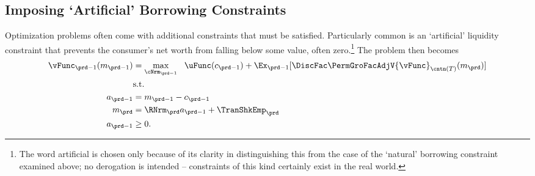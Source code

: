 \documentclass[\econtexRoot/SolvingMicroDSOPs]{subfiles}
\begin{document}
\subsection{Imposing `Artificial' Borrowing Constraints}

Optimization problems often come with additional constraints that must
be satisfied.  Particularly common is an `artificial' liquidity constraint that
prevents the consumer's net worth from falling below some value, often
zero.\footnote{The word artificial is chosen only because of its clarity in distinguishing
  this from the case of the `natural' borrowing constraint examined above; no derogation is
  intended -- constraints of this kind certainly exist in the real world.}  The problem then becomes
\begin{equation*}\begin{gathered}\begin{aligned}
      \vFunc_{\prd-1}(m_{\prd-1})  & = \max_{\cNrm_{\prd-1}} ~~ \uFunc(c_{\prd-1}) + \Ex_{\prd-1} [\DiscFac \PermGroFacAdjV{\vFunc}_{\cntn(T)}(m_{\prd})] \label{eq:ConstrArt}
      \\ & \mbox{s.t.}  \nonumber
      \\ a_{\prd-1}  & = m_{\prd-1} - c_{\prd-1}
      \\ m_{\prd}  & = \RNrm_{\prd} a_{\prd-1} + \TranShkEmp_{\prd}
      \\ a_{\prd-1} & \geq 0 .
    \end{aligned}\end{gathered}\end{equation*}

\end{document}
